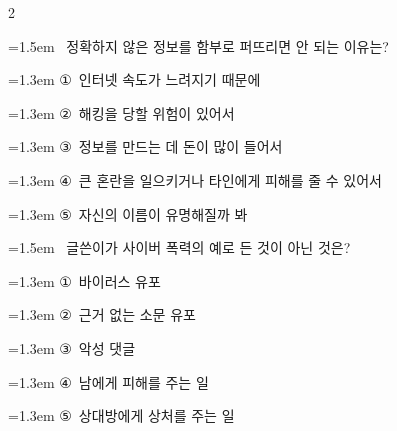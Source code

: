 \documentclass[11pt, a4paper]{article}
\begin{document}
\begin{multicols}{2}
\noindent\begin{minipage}{\columnwidth}
\vspace{2mm}
{\hangindent=1.5em  ~정확하지 않은 정보를 함부로 퍼뜨리면 안 되는 이유는?\par}

\vspace{0.5mm}
{\hangindent=1.3em  \noindent\hspace{0.3em}①~인터넷 속도가 느려지기 때문에\par}
{\hangindent=1.3em  \noindent\hspace{0.3em}②~해킹을 당할 위험이 있어서\par}
{\hangindent=1.3em  \noindent\hspace{0.3em}③~정보를 만드는 데 돈이 많이 들어서\par}
{\hangindent=1.3em  \noindent\hspace{0.3em}④~큰 혼란을 일으키거나 타인에게 피해를 줄 수 있어서\par}
{\hangindent=1.3em  \noindent\hspace{0.3em}⑤~자신의 이름이 유명해질까 봐\par}
\vspace{4mm}
\end{minipage}
\par

\noindent\begin{minipage}{\columnwidth}
\vspace{2mm}
{\hangindent=1.5em  ~글쓴이가 사이버 폭력의 예로 든 것이 아닌 것은?\par}

\vspace{0.5mm}
{\hangindent=1.3em  \noindent\hspace{0.3em}①~바이러스 유포\par}
{\hangindent=1.3em  \noindent\hspace{0.3em}②~근거 없는 소문 유포\par}
{\hangindent=1.3em  \noindent\hspace{0.3em}③~악성 댓글\par}
{\hangindent=1.3em  \noindent\hspace{0.3em}④~남에게 피해를 주는 일\par}
{\hangindent=1.3em  \noindent\hspace{0.3em}⑤~상대방에게 상처를 주는 일\par}
\vspace{4mm}
\end{minipage}
\par


\end{multicols}
\end{document}
